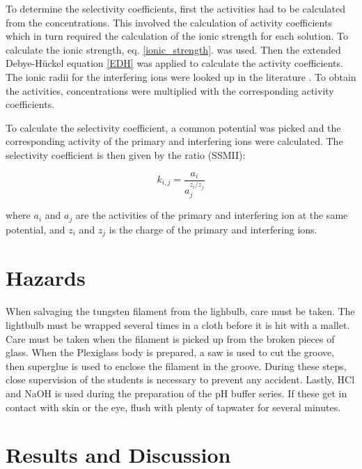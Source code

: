 \documentclass[manuscript=article, journal=jceda8]{achemso}
\begin{document}
To determine the selectivity coefficients, first the activities had to be calculated from the concentrations. This involved the calculation of activity coefficients which in turn required the calculation of the ionic strength for each solution. To calculate the ionic strength, eq. \ref{ionic_strength}. was used. Then the extended Debye-Hückel equation \ref{EDH} was applied to calculate the activity coefficients. The ionic radii for the interfering ions were looked up in the literature \cite{kielland1937individual}. To obtain the activities, concentrations were multiplied with the corresponding activity coefficients.

To calculate the selectivity coefficient, a common potential was picked and the corresponding activity of the primary and interfering ions were calculated. The selectivity coefficient is then given by the ratio (SSMII):

\begin{equation}
k_{i,j} = \frac{a_i} {a_j^{z_i/z_j}}
\end{equation}

where $a_i$ and $a_j$ are the activities of the primary and interfering ion at the same potential, and $z_i$ and $z_j$ is the charge of the primary and interfering ions.

\section{Hazards}
When salvaging the tungsten filament from the lighbulb, care must be taken. The lightbulb must be wrapped several times in a cloth before it is hit with a mallet. Care must be taken when the filament is picked up from the broken pieces of glass. When the Plexiglass body is prepared, a saw is used to cut the groove, then superglue is used to enclose the filament in the groove. During these steps, close supervision of the students is necessary to prevent any accident. Lastly, HCl and NaOH is used during the preparation of the pH buffer series. If these get in contact with skin or the eye, flush with plenty of tapwater for several minutes.


\section{Results and Discussion}
\end{document}
